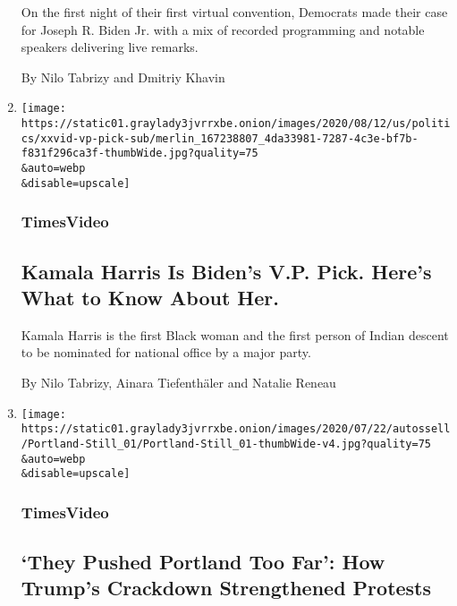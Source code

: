 \begin{enumerate}
  On the first night of their first virtual convention, Democrats made
  their case for Joseph R. Biden Jr. with a mix of recorded programming
  and notable speakers delivering live remarks.

  By Nilo Tabrizy and Dmitriy Khavin
\item
  \href{/video/us/politics/100000007231439/who-is-kamala-harris.html}{}

  \texttt{[image: https://static01.graylady3jvrrxbe.onion/images/2020/08/12/us/politics/xxvid-vp-pick-sub/merlin\_167238807\_4da33981-7287-4c3e-bf7b-f831f296ca3f-thumbWide.jpg?quality=75\\\&auto=webp\\\&disable=upscale]}

  \hypertarget{timesvideo-4}{%
  \subsubsection{TimesVideo}\label{timesvideo-4}}

  \hypertarget{kamala-harris-is-bidens-vp-pick-heres-what-to-know-about-her}{%
  \subsection{Kamala Harris Is Biden's V.P. Pick. Here's What to Know
  About
  Her.}\label{kamala-harris-is-bidens-vp-pick-heres-what-to-know-about-her}}

  Kamala Harris is the first Black woman and the first person of Indian
  descent to be nominated for national office by a major party.

  By Nilo Tabrizy, Ainara Tiefenthäler and Natalie Reneau
\item
  \href{/video/us/100000007250985/they-pushed-portland-too-far-trump-crackdown-strengthens-protests.html}{}

  \texttt{[image: https://static01.graylady3jvrrxbe.onion/images/2020/07/22/autossell/Portland-Still\_01/Portland-Still\_01-thumbWide-v4.jpg?quality=75\\\&auto=webp\\\&disable=upscale]}

  \hypertarget{timesvideo-5}{%
  \subsubsection{TimesVideo}\label{timesvideo-5}}

  \hypertarget{they-pushed-portland-too-far-how-trumps-crackdown-strengthened-protests}{%
  \subsection{`They Pushed Portland Too Far': How Trump's Crackdown
  Strengthened
  Protests}\label{they-pushed-portland-too-far-how-trumps-crackdown-strengthened-protests}}


\end{enumerate}

